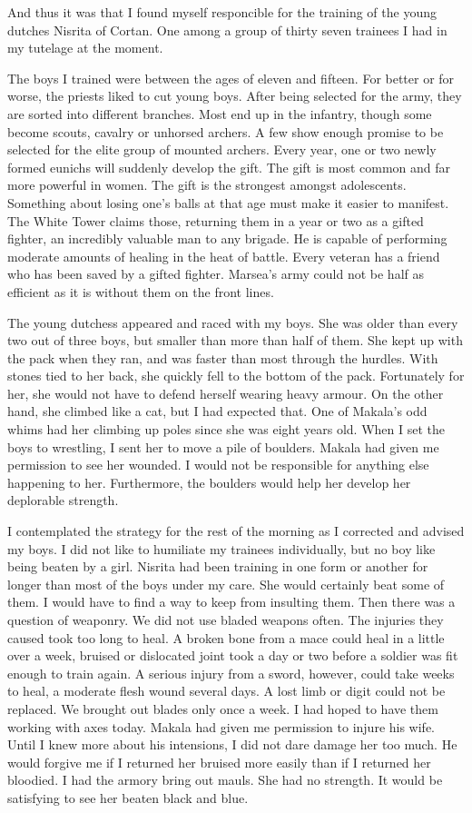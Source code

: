 \documentclass{article}
\begin{document}
And thus it was that I found myself responcible for the training of the young dutches Nisrita of Cortan. One among a group of thirty seven trainees I had in my tutelage at the moment.

The boys I trained were between the ages of eleven and fifteen. For better or for worse, the priests liked to cut young boys. After being selected for the army, they are sorted into different branches. Most end up in the infantry, though some become scouts, cavalry or unhorsed archers. A few show enough promise to be selected for the elite group of mounted archers. Every year, one or two newly formed eunichs will suddenly develop the gift. The gift is most common and far more powerful in women. The gift is the strongest amongst adolescents. Something about losing one's balls at that age must make it easier to manifest. The White Tower claims those, returning them in a year or two as a gifted fighter, an incredibly valuable man to any brigade. He is capable of performing moderate amounts of healing in the heat of battle. Every veteran has a friend who has been saved by a gifted fighter. Marsea's army could not be half as efficient as it is without them on the front lines.

The young dutchess appeared and raced with my boys. She was older than every two out of three boys, but smaller than more than half of them. She kept up with the pack when they ran, and was faster than most through the hurdles. With stones tied to her back, she quickly fell to the bottom of the pack. Fortunately for her, she would not have to defend herself wearing heavy armour. On the other hand, she climbed like a cat, but I had expected that. One of Makala's odd whims had her climbing up poles since she was eight years old. When I set the boys to wrestling, I sent her to move a pile of boulders. Makala had given me permission to see her wounded. I would not be responsible for anything else happening to her. Furthermore, the boulders would help her develop her deplorable strength. 

I contemplated the strategy for the rest of the morning as I corrected and advised my boys. I did not like to humiliate my trainees individually, but no boy like being beaten by a girl. Nisrita had been training in one form or another for longer than most of the boys under my care. She would certainly beat some of them. I would have to find a way to keep from insulting them. Then there was a question of weaponry. We did not use bladed weapons often. The injuries they caused took too long to heal. A broken bone from a mace could heal in a little over a week, bruised or dislocated joint took a day or two before a soldier was fit enough to train again. A serious injury from a sword, however, could take weeks to heal, a moderate flesh wound several days. A lost limb or digit could not be replaced. We brought out blades only once a week. I had hoped to have them working with axes today. Makala had given me permission to injure his wife. Until I knew more about his intensions, I did not dare damage her too much. He would forgive me if I returned her bruised more easily than if I returned her bloodied. I had the armory bring out mauls. She had no strength. It would be satisfying to see her beaten black and blue.
\end{document}
